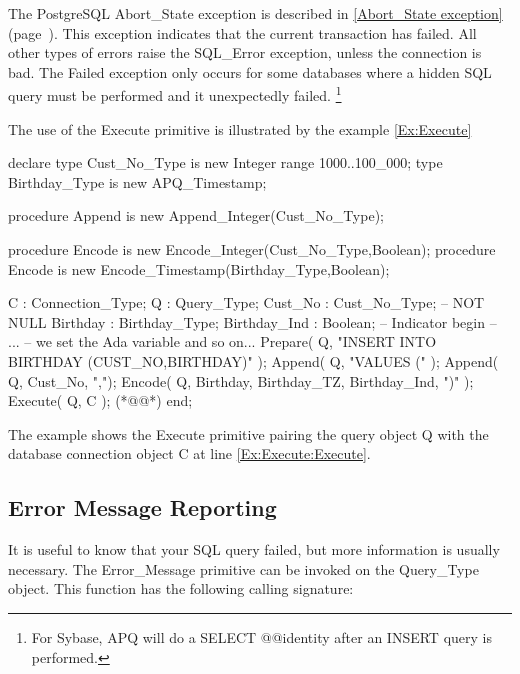 \documentclass[english,letterpaper]{book}
\newcommand\Ref[1]{\textsection\ref{#1} (page~\pageref{#1})}
\begin{document}
The PostgreSQL Abort\_State
exception is described in \Ref{Abort_State exception}. This exception indicates that
the current transaction has failed. All other types of errors raise
the SQL\_Error exception, unless the connection is bad. The Failed
exception only occurs for some databases where a hidden SQL query
must be performed and it unexpectedly failed.%
\footnote{For Sybase, APQ will do a SELECT @@identity after an INSERT query
is performed.%
}

The use of the Execute primitive is illustrated by the example \ref{Ex:Execute}

\begin{NumberedExample}[label=Ex:Execute,caption=Executing Queries]
declare
   type Cust_No_Type is new Integer range 1000..100_000;
   type Birthday_Type is new APQ_Timestamp;

   procedure Append is new Append_Integer(Cust_No_Type);

   procedure Encode is new Encode_Integer(Cust_No_Type,Boolean);
   procedure Encode is new Encode_Timestamp(Birthday_Type,Boolean);

   C            : Connection_Type;
   Q            : Query_Type;
   Cust_No      : Cust_No_Type;     -- NOT NULL
   Birthday     : Birthday_Type;
   Birthday_Ind : Boolean;          -- Indicator
begin
   -- ...
   -- we set the Ada variable and so on...
   Prepare( Q, "INSERT INTO BIRTHDAY (CUST_NO,BIRTHDAY)" );
   Append( Q, "VALUES (" );
   Append( Q, Cust_No, ",");
   Encode( Q, Birthday, Birthday_TZ, Birthday_Ind, ")" );
   Execute( Q, C ); (*@\label{Ex:Execute:Execute}@*)
end;
\end{NumberedExample}

The example shows the Execute primitive pairing the query object Q
with the database connection object C at line \ref{Ex:Execute:Execute}.

\subsection{Error Message Reporting\label{Error Message Reporting}}

It is useful to know that your SQL query failed, but more information
is usually necessary. The Error\_Message primitive can be invoked
on the Query\_Type object. This function has the following calling
signature:
\end{document}
